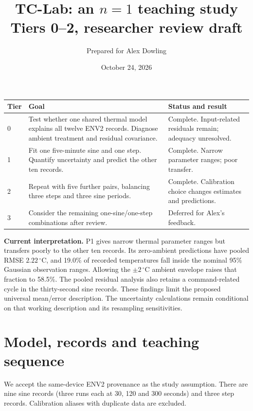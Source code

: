 \documentclass[10pt,letterpaper]{article}
\title{\vspace{-1.3em}TC-Lab: an $n=1$ teaching study\\\large Tiers 0--2, researcher review draft}
\author{Prepared for Alex Dowling}
\date{October 24, 2026}
\newcommand{\C}{\,^\circ\mathrm{C}}
\begin{document}
\maketitle
\vspace{-1em}
\begin{tabularx}{\linewidth}{@{}p{0.38in}X >{\raggedright\arraybackslash}p{1.35in}@{}}
\toprule
Tier & Goal & Status and result\\
\midrule
0 & Test whether one shared thermal model explains all twelve ENV2 records. Diagnose ambient treatment and residual covariance. & Complete. Input-related residuals remain; adequacy unresolved.\\
1 & Fit one five-minute sine and one step. Quantify uncertainty and predict the other ten records. & Complete. Narrow parameter ranges; poor transfer.\\
2 & Repeat with five further pairs, balancing three steps and three sine periods. & Complete. Calibration choice changes estimates and predictions.\\
3 & Consider the remaining one-sine/one-step combinations after review. & Deferred for Alex's feedback.\\
\bottomrule
\end{tabularx}

\textbf{Current interpretation.} P1 gives narrow thermal parameter ranges but transfers poorly to the other ten records. Its zero-ambient predictions have pooled RMSE $2.22\C$, and 19.0\% of recorded temperatures fall inside the nominal 95\% Gaussian observation ranges. Allowing the $\pm2\C$ ambient envelope raises that fraction to 58.5\%. The pooled residual analysis also retains a command-related cycle in the thirty-second sine records. These findings limit the proposed universal mean/error description. The uncertainty calculations remain conditional on that working description and its resampling sensitivities.

\section{Model, records and teaching sequence}
We accept the same-device ENV2 provenance as the study assumption. There are nine sine records (three runs each at 30, 120 and 300 seconds) and three step records. Calibration aliases with duplicate data are excluded.
\end{document}
